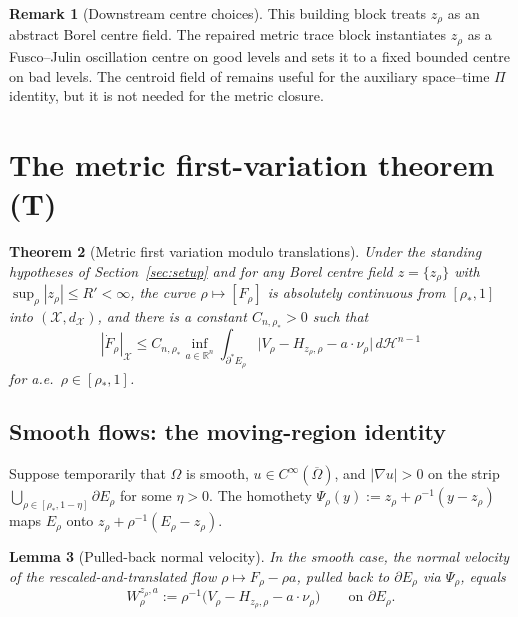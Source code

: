 \documentclass[11pt]{article}
\newtheorem{theorem}{Theorem}[section]
\newtheorem{lemma}[theorem]{Lemma}
\theoremstyle{definition}
\newtheorem{remark}[theorem]{Remark}
\newcommand{\R}{\mathbb{R}}
\newcommand{\Om}{\Omega}
\newcommand{\rstar}{\rho_{*}}
\newcommand{\X}{\mathcal X}
\begin{document}
\begin{remark}[Downstream centre choices]
\label{rem:centroid}
This building block treats $z_\rho$ as an abstract Borel centre field.
The repaired metric trace block instantiates $z_\rho$ as a Fusco--Julin
oscillation centre on good levels and sets it to a fixed bounded centre on
bad levels.  The centroid field of \cite{CentroidBound} remains useful for
the auxiliary space--time $\Pi$ identity, but it is not needed for the
metric closure.
\end{remark}

\section{The metric first-variation theorem (T)}\label{sec:T}

\begin{theorem}[Metric first variation modulo translations]\label{thm:T}
Under the standing hypotheses of Section~\ref{sec:setup} and for any Borel
centre field $z=\{z_\rho\}$ with $\sup_\rho|z_\rho|\le R'<\infty$, the curve
$\rho\mapsto[F_\rho]$ is absolutely continuous from $[\rstar,1]$ into
$(\X,d_\X)$, and there is a constant $C_{n,\rstar}>0$ such that
\begin{equation}\label{eq:T}
   |\dot F_\rho|_\X
   \le C_{n,\rstar}\inf_{a\in\R^n}
       \int_{\partial^*E_\rho}\bigl|V_\rho-H_{z_\rho,\rho}-a\cdot\nu_\rho\bigr|
       \,d\mathcal H^{n-1}
\end{equation}
for a.e.\ $\rho\in[\rstar,1]$.
\end{theorem}

\subsection{Smooth flows: the moving-region identity}\label{ss:T-smooth}

Suppose temporarily that $\Om$ is smooth, $u\in C^\infty(\overline{\Om})$,
and $|\nabla u|>0$ on the strip
$\bigcup_{\rho\in[\rstar,1-\eta]}\partial E_\rho$ for some $\eta>0$. The
homothety $\Psi_\rho(y):=z_\rho+\rho^{-1}(y-z_\rho)$ maps $E_\rho$ onto
$z_\rho+\rho^{-1}(E_\rho-z_\rho)$.

\begin{lemma}[Pulled-back normal velocity]\label{lem:W}
In the smooth case, the normal velocity of the rescaled-and-translated flow
$\rho\mapsto F_\rho-\rho a$, pulled back to $\partial E_\rho$ via
$\Psi_\rho$, equals
\begin{equation}\label{eq:W}
   W_\rho^{z_\rho,a}:=\rho^{-1}\bigl(V_\rho-H_{z_\rho,\rho}-a\cdot\nu_\rho\bigr)
   \qquad\text{on }\partial E_\rho.
\end{equation}
\end{lemma}
\end{document}
